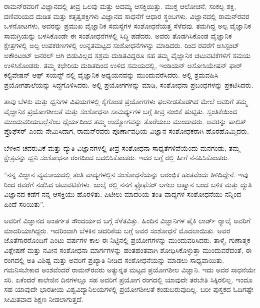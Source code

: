 ರಾಮನ್‍ರವರಿಗೆ ವಿಜ್ಞಾನದಲ್ಲಿ ತೀವ್ರ ಒಲವು ಮತ್ತು ಅದಮ್ಯ ಆಸಕ್ತಿಯಿತ್ತು. ಮುಕ್ತ ಆಲೋಚನೆ, ಸಂಕಲ್ಪ ಶಕ್ತಿ, ದಣಿವರಿಯದ ದುಡಿತ ಮತ್ತು ಕತೃತ್ವಶಕ್ತಿಗಳು ವಿಜ್ಞಾನದ ಸಾಧನೆಗೆ ಆಧಾರ ಸ್ಥಂಬಗಳು. ವಿಜ್ಞಾನದಲ್ಲಿ ರಾಮನ್‍ರವರ ಒಳನೋಟಗಳು, ಅವರನ್ನು ಪ್ರಮುಖ ವೈಜ್ಞಾನಿಕ ಸಮಸ್ಯೆಗಳ ಸಂಶೋಧನೆಯತ್ತ ಸೆಳೆದವು. ತಮಗಿದ್ದ ಅಲ್ಪ ವೈಜ್ಞಾನಿಕ ಸಾಮಗ್ರಿಯನ್ನು ಬಳಸಿಕೊಂಡೇ ಈ ಸಂಶೋಧನೆಗಳಲ್ಲಿ ಸಿದ್ಧಿ ಪಡೆದರು. ಅವರು ತೊಡಗಿಸಿಕೊಂಡ ವೈಜ್ಞಾನಿಕ ಕ್ಷೇತ್ರಗಳಲ್ಲಿ ಅಲ್ಪ ಉಪಕರಣಗಳಲ್ಲಿ ಉನ್ನತಮಟ್ಟದ ಸಂಶೋಧನೆಗಳನ್ನು ಮಾಡಿದರು.  ರಿಂದ ರವರೆಗೆ ಅಸಿಸ್ಟಂಟ್ ಅಕೌಂಟಂಟ್ ಜನರಲ್ ಆಗಿ ಬಿಡುವಿಲ್ಲದ ಸಶ್ರಮ ದುಡಿತವಿದ್ದರೂ ಸಹ ತಮ್ಮ ವೈಜ್ಞಾನಿಕ ಚಟುವಟಿಕೆಗಳಿಗೆ ಸಮಯ ಉಳಿಸಿಕೊಂಡರು. ತಮ್ಮ ಕಛೇರಿಯ ದುಡಿತದಿಂದ ಉಳಿದ ಸಮಯದಲ್ಲಿ, ಇಂಡಿಯನ್ ಅಸೋಸಿಯೇಷನ್ ಫಾರ್ ಕಲ್ಟಿವೇಷನ್ ಆಫ್ ಸಯನ್ಸ್ ನಲ್ಲಿ ವೈಜ್ಞಾನಿಕ ಅಧ್ಯಯನವನ್ನು ಮುಂದುವರೆಸಿದರು. ಅಲ್ಲಿ ಶ್ರಮವಹಿಸಿ ಪ್ರಯೋಗಶಾಲೆಯನ್ನು ಸಿದ್ಧಗೊಳಿಸಿದರು. ಅಲ್ಲಿ ಪ್ರಯೋಗಗಳನ್ನು ಮಾಡಿ, ಸಂಶೋಧನಾ ಪ್ರಬಂಧಗಳನ್ನು ಪ್ರಕಟಿಸಿದರು.

ತಾವು ಬೆಳಕು ಮತ್ತು ಧ್ವನಿಗಳ ವಿಷಯಗಳಲ್ಲಿ ಕೈಗೊಂಡ ಪ್ರಯೋಗಗಳು ಫಲನೀಡತೊಡಗಿದ ಮೇಲೆ ಅವರಿಗೆ ತಮ್ಮ ವೈಜ್ಞಾನಿಕ ಪ್ರಯೋಗಶೀಲತೆ ಮತ್ತು ಸಂಶೋಧನಾ ಸಾಮರ್ಥ್ಯಗಳ ಬಗ್ಗೆ ತೀವ್ರ ನಂಬಿಕೆ ಹುಟ್ಟಿತು. ಸ್ವಂತಿಕೆಯಿಂದ ಮುಂದುವರಿಯಬಲ್ಲೆನೆಂಬ ಧೈರ್ಯದಿಂದ ತಮ್ಮ ಉದ್ಯೋಗವನ್ನು ತೊರೆಯಲು ಮುಂದಾದರು. ಅವರನ್ನು ಪಾಲಿತ್ ಪ್ರೊಫೆಸರ್ ಎಂದು ನೇಮಿಸಿದಾಗ, ರಾಮನ್‍ರವರು ಪೂರ್ಣಾವಧಿಯ ವಿಜ್ಞಾನ ಸಂಶೋಧಕರಾಗಿ ಹೊರಹೊಮ್ಮಿದರು.

ಬೆಳಕಿನ ಚದರುವಿಕೆ ಮತ್ತು ದ್ಯುತಿ ವಿಜ್ಞಾನಗಳಲ್ಲಿ ತೀವ್ರ ಸಂಶೋಧನಾ ಸಾಧ್ಯತೆಗಳಿವೆಯೆಂದು ಮನಗಂಡು, ತಮ್ಮ ಕ್ಷೇತ್ರವನ್ನು ಧ್ವನಿ ಸಂಶೋಧನಾ ರಂಗದಿಂದ ಬದಲಿಸಿಕೊಂಡರು. ಇದರ ಬಗ್ಗೆ ರಲ್ಲಿ ಹೀಗೆ ನೆನಪಿಸಿಕೊಂಡರು.

\newpage

“ನನ್ನ ವಿಜ್ಞಾನ ವ್ಯವಸಾಯದಲ್ಲಿ ತಂತಿ ವಾದ್ಯಗಳಲ್ಲಿನ ಸಂಶೋಧನೆಯನ್ನು ಆರಂಭಿಕ ಹಂತವೆಂದು ತಿಳಿದಿದ್ದೇನೆ. ಇವು  ರಿಂದ  ರವರೆಗೆ ನಡೆಸಿದ ಚಟುವಟಿಕೆಗಳು. ಜುಲೈ ರಲ್ಲಿ ನನಗೆ ಫ್ರೊಫೆಸರ್ ಆಗಲು ಆಹ್ವಾನ ಬಂದ ಬಳಿಕ ಮತ್ತು ದ್ಯುತಿ ವಿಜ್ಞಾನದ ಕಡೆಗೆ ನನ್ನ ಆಸಕ್ತಿಯು ಹೊರಳಿತು. ಪಿಟೀಲು ಮಾದರಿಯ ತಂತಿ ವಾದ್ಯಗಳ ಸಂಶೋಧನೆಯು ನನ್ನಿಂದ ಹಿಂದೆ ಸರಿಯಿತು”.

ಅವರಿಗೆ ವಿಜ್ಞಾನದ ಅಂತರ್ಗತ ಸೌಂದರ್ಯದ ಬಗ್ಗೆ ಸೆಳೆತವಿತ್ತು. ಹಿಂದಿನ ವಿಜ್ಞಾನಿಗಳ ಪೈಕಿ ಲಾರ್ಡ್ ರ‍್ಯಾಲೈ ಅವರಿಗೆ ಮಾದರಿಯಾಗಿದ್ದರು. ಇದರಿಂದಾಗಿ ಬೆಳಕಿನ ಚದರಿಕೆಯ ಬಗ್ಗೆ ಅವರ ಸಂಶೋಧನೆ ಮೊದಲಾಯಿತು. ಅವರ ಜೊತೆಗಾರರೊಂದಿಗೆ ಎಂಟು ವರ್ಷಗಳ ಕಾಲ ಈ ನಿಟ್ಟಿನಲ್ಲಿ ಪ್ರಯೋಗಗಳನ್ನು ಮುಂದುವರಿಸಿದರು. ತಾಳ್ಮೆ, ಗುಣಾತ್ಮಕ ವಿಶ್ಲೇಷಣೆ ಮತ್ತು ನವೀನ ಸಂಶೋಧನಾ ಮಾರ್ಗಗಳನ್ನು ಹಂತಹಂತವಾಗಿ ಶೋಧಿಸಿಕೊಳ್ಳುತ್ತಾ ಮುಂದುವರೆದಂತೆ, ಈ ರಂಗದಲ್ಲಿ ಅತಿ ವಿಶಿಷ್ಟ ಮತ್ತು ಅವರಿಗೆ ಪ್ರಖ್ಯಾತಿ ನೀಡಿದ ಸಂಶೋಧನೆಯನ್ನು ಮಾಡಲು ಸಾಧ್ಯವಾಯಿತು. ಗಮನಿಸಬೇಕಾದ ಅಂಶವೆಂದರೆ ರಾಮನ್‍ರವರು ಅತ್ಯುನ್ನತ ಮಟ್ಟದ ಪ್ರಯೋಗಶೀಲ ವಿಜ್ಞಾನಿ. ಇದು ಅವರ ಸಾಧನೆಯೇ ಸರಿ. ಏಕೆಂದರೆ ಕಾಲೇಜಿನ ದಿನಗಳಲ್ಲೂ ಸಹ ಅವರಿಗೆ ಪ್ರಯೋಗ ರಂಗದಲ್ಲಿ ಯಾವುದೇ ತರಬೇತಿ ಸಿಕ್ಕಿರಲಿಲ್ಲ. ಇಂದೂ ಸಹ ಯಾವುದೇ ಭಾರತೀಯ ವಿಶ್ವವಿದ್ಯಾನಿಲಯಗಳಲ್ಲಿ ಪ್ರಯೋಗಶೀಲತೆ ಕಂಡುಬರುವುದಿಲ್ಲ. ಬರೀ ಪುಸ್ತಕದ ಓದಿಗಷ್ಟೇ ಸೀಮಿತವಾದ ಶಿಕ್ಷಣ ನೀಡಲಾಗು\-ತ್ತದೆ.

